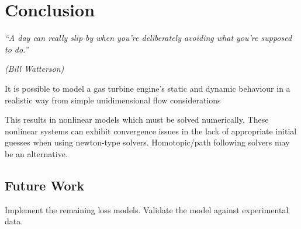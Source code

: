 \documentclass[tcc]{subfiles}
\begin{document}
\chapter{Conclusion}
\label{ch:conclusion}
        \epigraph{\em ``A day can really slip by when you're deliberately avoiding what you're
        supposed to do.''}
        {\em (Bill Watterson)}

        It is possible to model a gas turbine engine's static and dynamic behaviour in a realistic way from simple unidimensional flow considerations

        This results in nonlinear models which must be solved numerically. These nonlinear systems can exhibit convergence issues in the lack of appropriate initial guesses when using newton-type solvers. Homotopic/path following solvers may be an alternative.



        \section{Future Work}
        Implement the remaining loss models. Validate the model against experimental data.
\end{document}
